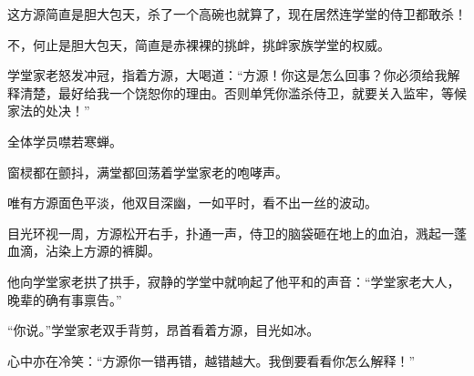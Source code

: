 \begin{this_body}
这方源简直是胆大包天，杀了一个高碗也就算了，现在居然连学堂的侍卫都敢杀！

不，何止是胆大包天，简直是赤裸裸的挑衅，挑衅家族学堂的权威。

学堂家老怒发冲冠，指着方源，大喝道：“方源！你这是怎么回事？你必须给我解释清楚，最好给我一个饶恕你的理由。否则单凭你滥杀侍卫，就要关入监牢，等候家法的处决！”

全体学员噤若寒蝉。

窗棂都在颤抖，满堂都回荡着学堂家老的咆哮声。

唯有方源面色平淡，他双目深幽，一如平时，看不出一丝的波动。

目光环视一周，方源松开右手，扑通一声，侍卫的脑袋砸在地上的血泊，溅起一蓬血滴，沾染上方源的裤脚。

他向学堂家老拱了拱手，寂静的学堂中就响起了他平和的声音：“学堂家老大人，晚辈的确有事禀告。”

“你说。”学堂家老双手背剪，昂首看着方源，目光如冰。

心中亦在冷笑：“方源你一错再错，越错越大。我倒要看看你怎么解释！”

\end{this_body}

